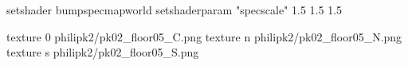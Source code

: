 setshader bumpspecmapworld
setshaderparam "specscale" 1.5 1.5 1.5

texture 0 philipk2/pk02_floor05_C.png
texture n philipk2/pk02_floor05_N.png
texture s philipk2/pk02_floor05_S.png

